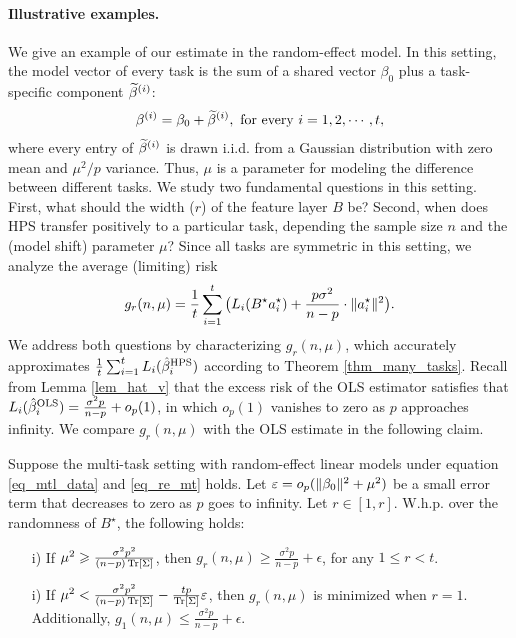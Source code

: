 \paragraph{Illustrative examples.}
We give an example of our estimate in the random-effect model.
In this setting, the model vector of every task is the sum of a shared vector $\beta_0$ plus a task-specific component $\widetilde \beta^{(i)}$:
\begin{align}
    \beta^{(i)} = \beta_0 + \wt \beta^{(i)}, \text{ for every } i=1,2,\cdots, t, \label{eq_re_mt}
\end{align}
where every entry of $\widetilde \beta^{(i)}$ is drawn i.i.d. from a Gaussian distribution with zero mean and ${\mu^2}/p$ variance.
Thus, $\mu$ is a parameter for modeling the difference between different tasks.
We study two fundamental questions in this setting.
First, what should the width ($r$) of the feature layer $B$ be?
Second, when does HPS transfer positively to a particular task, depending the sample size $n$ and the (model shift) parameter $\mu$?
Since all tasks are symmetric in this setting, we analyze the average (limiting) risk
\[ g_r(n, \mu) = \frac {1}{t} \sum_{i=1}^t \big(L_i(B^{\star} a_i^{\star}) + \frac{p \sigma^2}{n - p} \cdot \|a_i^{\star}\|^2\big). \]
We address both questions by characterizing $g_r(n, \mu)$, which accurately approximates $\frac{1}{t} \sum_{i=1}^t L_i(\hat{\beta}_i^{\textup{HPS}})$ according to Theorem \ref{thm_many_tasks}.
Recall from Lemma \ref{lem_hat_v} that the excess risk of the OLS estimator satisfies that $L_i(\hat{\beta}_i^{\textup{OLS}}) = \frac{\sigma^2 p}{n - p} + o_p(1)$, in which $o_p(1)$ vanishes to zero as $p$ approaches infinity.
We compare $g_r(n, \mu)$ with the OLS estimate in the following claim.
\begin{claim}\label{claim_re_multi}
    Suppose the multi-task setting with random-effect linear models under equation \eqref{eq_mtl_data} and \eqref{eq_re_mt} holds.
    Let $\varepsilon = o_p(\|\beta_0\|^2 + \mu^2)$ be a small error term that decreases to zero as $p$ goes to infinity.
    Let $r \in [1, r]$.
    W.h.p. over the randomness of $B^{\star}$, the following holds:
    \begin{enumerate}
        \item[i)] If $\mu^2 \geqslant \frac{\sigma^2 p^2}{(n - p) \operatorname{Tr}[\Sigma]}$, then $g_r(n, \mu) \ge \frac{\sigma^2 p}{n - p} + \epsilon$, for any $1\le r < t$.
    	\item[i)] If $\mu^2 < \frac{\sigma^2 p^2}{(n - p)\operatorname{Tr}[\Sigma]} - \frac{t p}{\operatorname{Tr}\left[\Sigma\right]} \varepsilon$, then $g_r(n, \mu)$ is minimized when $r=1$.
    	Additionally, $g_1(n, \mu) \le \frac{\sigma^2 p}{n - p} + \epsilon$.
    \end{enumerate}
\end{claim}
